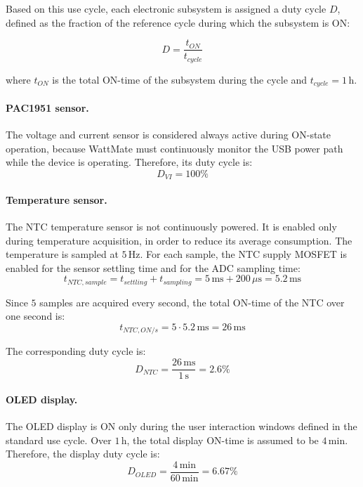 Based on this use cycle, each electronic subsystem is assigned a duty cycle \(D\), defined as the fraction of the reference cycle during which the subsystem is ON:

\begin{equation}
	D = \frac{t_{ON}}{t_{cycle}}
\end{equation}

where \(t_{ON}\) is the total ON-time of the subsystem during the cycle and \(t_{cycle}=1\,\mathrm{h}\).


\paragraph{PAC1951 sensor.}
The voltage and current sensor is considered always active during ON-state operation, because WattMate must continuously monitor the USB power path while the device is operating. 
Therefore, its duty cycle is:
\begin{equation}
	D_{VI} = 100\%
\end{equation}

\paragraph{Temperature sensor.}
The NTC temperature sensor is not continuously powered. It is enabled only during temperature acquisition, in order to reduce its average consumption. The temperature is sampled at \(5\,\mathrm{Hz}\). For each sample, the NTC supply MOSFET is enabled for the sensor settling time and for the ADC sampling time:
\begin{equation}
	t_{NTC,sample} = t_{settling} + t_{sampling}
	= 5\,\mathrm{ms} + 200\,\mu\mathrm{s}
	= 5.2\,\mathrm{ms}
\end{equation}

Since \(5\) samples are acquired every second, the total ON-time of the NTC over one second is:
\begin{equation}
	t_{NTC,ON/s} = 5 \cdot 5.2\,\mathrm{ms}
	= 26\,\mathrm{ms}
\end{equation}

The corresponding duty cycle is:
\begin{equation}
	D_{NTC} = \frac{26\,\mathrm{ms}}{1\,\mathrm{s}}
	= 2.6\%
\end{equation}

\paragraph{OLED display.}
The OLED display is ON only during the user interaction windows defined in the standard use cycle. 
Over \(1\,\mathrm{h}\), the total display ON-time is assumed to be \(4\,\mathrm{min}\). 
Therefore, the display duty cycle is:
\begin{equation}
	D_{OLED} = \frac{4\,\mathrm{min}}{60\,\mathrm{min}}
	= 6.67\%
\end{equation}

